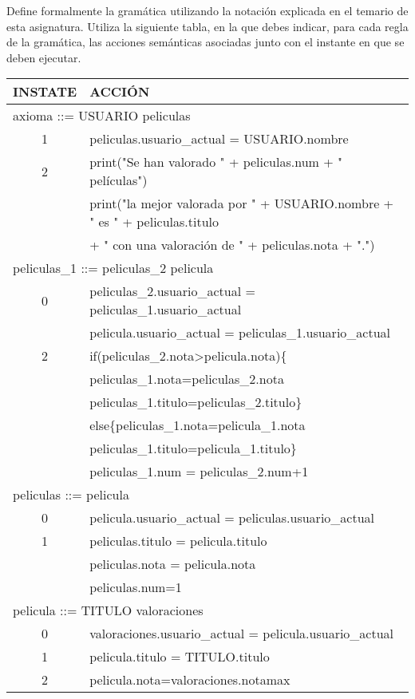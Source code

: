 \begin{problem}[2]
Define formalmente la gramática utilizando la notación explicada en el temario de esta asignatura. Utiliza la siguiente tabla, en la que debes indicar, para cada regla de la gramática, las acciones semánticas asociadas junto con el instante en que se deben ejecutar.
\solution
\begin{tabular}{|c|l|}
\hline
INSTATE & ACCIÓN \\
\hline
\multicolumn{2}{|l|}{axioma ::= USUARIO peliculas} \\
\hline
 1 & peliculas.usuario\_actual = USUARIO.nombre \\
\hline
 2 & print("Se han valorado " + peliculas.num + " películas") \\
 & print("la mejor valorada por " + USUARIO.nombre + " es " + peliculas.titulo \\ & + " con una valoración de " + peliculas.nota + ".")\\
 \hline
\multicolumn{2}{|l|}{peliculas\_1 ::= peliculas\_2 pelicula} \\
\hline
 0 & peliculas\_2.usuario\_actual = peliculas\_1.usuario\_actual \\ & pelicula.usuario\_actual = peliculas\_1.usuario\_actual\\
 \hline
 2 & if(peliculas\_2.nota>pelicula.nota)\{\\ &
 peliculas\_1.nota=peliculas\_2.nota\\ &
 peliculas\_1.titulo=peliculas\_2.titulo\}\\ &
 else\{peliculas\_1.nota=pelicula\_1.nota\\ &
 peliculas\_1.titulo=pelicula\_1.titulo\}\\ &
 peliculas\_1.num = peliculas\_2.num+1\\
\hline
\multicolumn{2}{|l|}{peliculas ::= pelicula} \\
\hline
 0 & pelicula.usuario\_actual = peliculas.usuario\_actual \\
 \hline
 1 & peliculas.titulo = pelicula.titulo \\ & peliculas.nota = pelicula.nota \\ &
 peliculas.num=1\\
\hline
\multicolumn{2}{|l|}{pelicula ::= TITULO valoraciones} \\
\hline
0 & valoraciones.usuario\_actual = pelicula.usuario\_actual \\
 \hline
 1 & pelicula.titulo = TITULO.titulo \\
 \hline
 2 & pelicula.nota=valoraciones.notamax\\

\end{tabular}
\end{problem}
